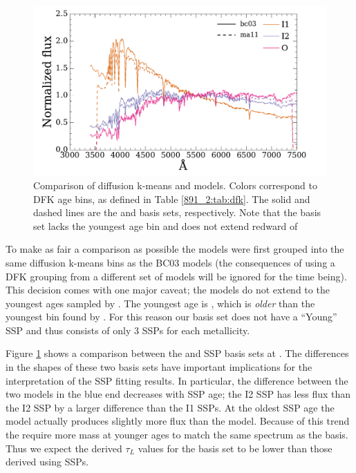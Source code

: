 \begin{figure}
  \centering
  \includegraphics[width=\columnwidth]{891_2/figs/ma_bc_comp.pdf}
  \caption[Comparison of DFK BC03 and MA11 SSP template
    libraries]{\fixspacing\label{891_2:fig:ma_bc_comp}Comparison of
    diffusion k-means  and
     models. Colors correspond to DFK age bins,
    as defined in Table \ref{891_2:tab:dfk}. The solid and dashed
    lines are the  and 
    basis sets, respectively. Note that the 
    basis set lacks the youngest age bin and does not extend redward
    of }
\end{figure}

To make as fair a comparison as possible the 
models were first grouped into the same diffusion k-means bins as the
BC03 models (the consequences of using a DFK grouping from a different
set of models will be ignored for the time being). This decision comes
with one major caveat; the  models do not
extend to the youngest ages sampled by . The
youngest  age is , which is
\emph{older} than the youngest bin found by . For
this reason our  basis set does not have a
``Young'' SSP and thus consists of only 3 SSPs for each metallicity.


Figure \ref{891_2:fig:ma_bc_comp} shows a comparison between the
 and  SSP basis sets at
. The differences in the shapes of these two basis sets
have important implications for the interpretation of the SSP fitting
results. In particular, the difference between the two models in the
blue end decreases with SSP age; the I2  SSP
has less flux than the I2  SSP by a larger
difference than the I1 SSPs. At the oldest SSP age the
 model actually produces slightly more flux
than the  model. Because of this trend the
 require more mass at younger ages to match the
same spectrum as the  basis. Thus we expect the
derived $\tau_L$ values for the  basis set to
be lower than those derived using  SSPs.

